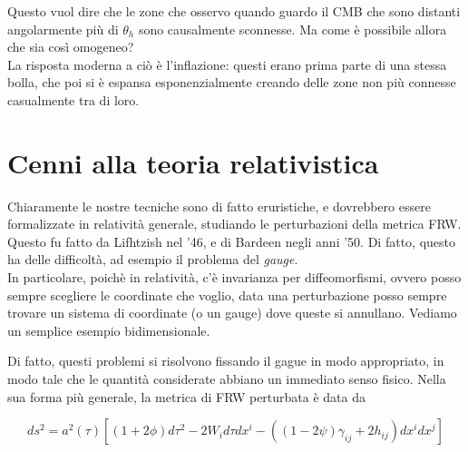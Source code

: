 \documentclass{report}
\begin{document}
Questo vuol dire che le zone che osservo quando guardo il CMB che sono distanti angolarmente più di $\theta_h$ sono causalmente sconnesse. Ma come è possibile allora che sia così omogeneo? \\
La risposta moderna a ciò è l'inflazione: questi erano prima parte di una stessa bolla, che poi si è espansa esponenzialmente creando delle zone non più connesse casualmente tra di loro. 

\section{Cenni alla teoria relativistica}

Chiaramente le nostre tecniche sono di fatto eruristiche, e dovrebbero essere formalizzate in relatività generale, studiando le perturbazioni della metrica FRW. Questo fu fatto da Lifhtzish nel '46, e di Bardeen negli anni '50. Di fatto, questo ha delle difficoltà, ad esempio il problema del \emph{gauge}. \\

In particolare, poichè in relatività, c'è invarianza per diffeomorfismi, ovvero posso sempre scegliere le coordinate che voglio, data una perturbazione posso sempre trovare un sistema di coordinate (o un gauge) dove queste si annullano. Vediamo un semplice esempio bidimensionale. 


Di fatto, questi problemi si risolvono fissando il gague in modo appropriato, in modo tale che le quantità considerate abbiano un immediato senso fisico. Nella sua forma più generale, la metrica di FRW perturbata è data da 

\begin{equation}
    ds^2 = a^2(\tau)\left[(1+2\phi)d\tau^2 - 2W_id\tau dx^i - ((1-2\psi)\gamma_{ij} + 2h_{ij})dx^idx^j\right]
\end{equation}
\end{document}
